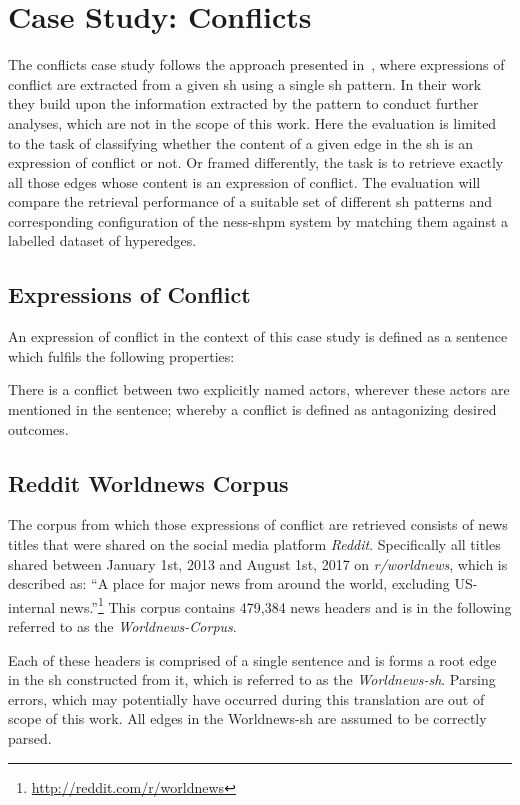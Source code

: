 \documentclass[11pt, numbers=noenddot]{scrreprt}
\let\citef\cite  %
\let\cite\parencite  %
\begin{document}
\section{Case Study: Conflicts}
The conflicts case study follows the approach presented in \citef{menezesSemanticHypergraphs2021}, where expressions of conflict are extracted from a given \gls{sh} using a single \gls{sh} pattern. In their work they build upon the information extracted by the pattern to conduct further analyses, which are not in the scope of this work. Here the evaluation is limited to the task of classifying whether the content of a given edge in the \gls{sh} is an expression of conflict or not. Or framed differently, the task is to retrieve exactly all those edges whose content is an expression of conflict. The evaluation will compare the retrieval performance of a suitable set of different \gls{sh} patterns and corresponding configuration of the \gls{ness-shpm} system by matching them against a labelled dataset of hyperedges.

\subsection{Expressions of Conflict}
\label{sec:conflict-definition}
An expression of conflict in the context of this case study is defined as a sentence which fulfils the following properties:

\begin{displayquote}
There is a conflict between two explicitly named actors, wherever these actors are mentioned in the sentence; whereby a conflict is defined as antagonizing desired outcomes.
\end{displayquote}

\subsection{Reddit Worldnews Corpus}
The corpus from which those expressions of conflict are retrieved consists of news titles that were shared on the social media platform \textit{Reddit}. Specifically all titles shared between January 1st, 2013 and August 1st, 2017 on \textit{r/worldnews}, which is described as: “A place for major news from around the world, excluding US-internal news.”\footnote{\url{http://reddit.com/r/worldnews}} This corpus contains 479,384 news headers and is in the following referred to as the \textit{Worldnews-Corpus}.

Each of these headers is comprised of a single sentence and is forms a root edge in the \gls{sh} constructed from it, which is referred to as the \textit{Worldnews-\gls{sh}}. Parsing errors, which may potentially have occurred during this translation are out of scope of this work. All edges in the Worldnews-\gls{sh} are assumed to be correctly parsed.
\end{document}
